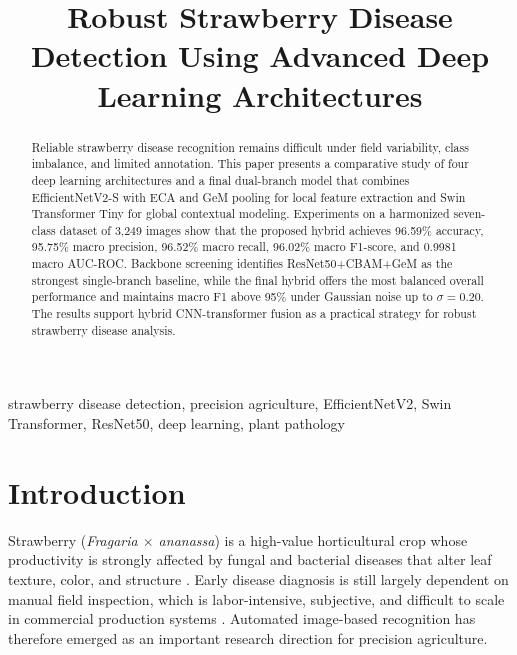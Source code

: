 \documentclass[conference]{IEEEtran}
\begin{document}
\title{Robust Strawberry Disease Detection Using Advanced Deep Learning Architectures}

\author{
}

\maketitle

\begin{abstract}
Reliable strawberry disease recognition remains difficult under field variability, class imbalance, and limited annotation. This paper presents a comparative study of four deep learning architectures and a final dual-branch model that combines EfficientNetV2-S with ECA and GeM pooling for local feature extraction and Swin Transformer Tiny for global contextual modeling. Experiments on a harmonized seven-class dataset of 3,249 images show that the proposed hybrid achieves 96.59\% accuracy, 95.75\% macro precision, 96.52\% macro recall, 96.02\% macro F1-score, and 0.9981 macro AUC-ROC. Backbone screening identifies ResNet50+CBAM+GeM as the strongest single-branch baseline, while the final hybrid offers the most balanced overall performance and maintains macro F1 above 95\% under Gaussian noise up to $\sigma=0.20$. The results support hybrid CNN-transformer fusion as a practical strategy for robust strawberry disease analysis.
\end{abstract}

\begin{IEEEkeywords}
strawberry disease detection, precision agriculture, EfficientNetV2, Swin Transformer, ResNet50, deep learning, plant pathology
\end{IEEEkeywords}

\section{Introduction}
Strawberry (\textit{Fragaria $\times$ ananassa}) is a high-value horticultural crop whose productivity is strongly affected by fungal and bacterial diseases that alter leaf texture, color, and structure \cite{afzaal2021}. Early disease diagnosis is still largely dependent on manual field inspection, which is labor-intensive, subjective, and difficult to scale in commercial production systems \cite{mohanty2016,ferentinos2018}. Automated image-based recognition has therefore emerged as an important research direction for precision agriculture.
\end{document}

